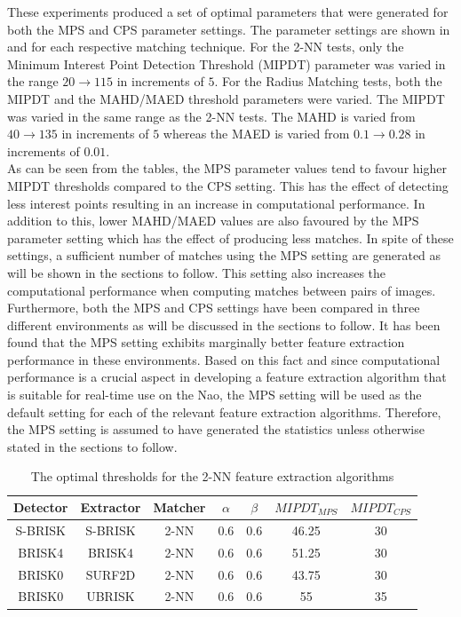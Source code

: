 These experiments produced a set of optimal parameters that were generated for both the MPS and CPS parameter settings. The parameter settings are shown in  and  for each respective matching technique. For the 2-NN tests, only the Minimum Interest Point Detection Threshold (MIPDT) parameter was varied in the range $20 \rightarrow 115$ in increments of $5$. For the Radius Matching tests, both the MIPDT and the MAHD/MAED threshold parameters were varied. The MIPDT was varied in the same range as the 2-NN tests. The MAHD is varied from $40 \rightarrow 135$ in increments of $5$ whereas the MAED is varied from $0.1 \rightarrow 0.28$ in increments of $0.01$.\\

As can be seen from the tables, the MPS parameter values tend to favour higher MIPDT thresholds compared to the CPS setting. This has the effect of detecting less interest points resulting in an increase in computational performance. In addition to this, lower MAHD/MAED values are also favoured by the MPS parameter setting which has the effect of producing less matches. In spite of these settings, a sufficient number of matches using the MPS setting are generated as will be shown in the sections to follow. This setting also increases the computational performance when computing matches between pairs of images.\\

Furthermore, both the MPS and CPS settings have been compared in three different environments as will be discussed in the sections to follow. It has been found that the MPS setting exhibits marginally better feature extraction performance in these environments. Based on this fact and since computational performance is a crucial aspect in developing a feature extraction algorithm that is suitable for real-time use on the Nao, the MPS setting will be used as the default setting for each of the relevant feature extraction algorithms. Therefore, the MPS setting is assumed to have generated the statistics unless otherwise stated in the sections to follow.\\

\begin{table}
\centering
\caption{The optimal thresholds for the 2-NN feature extraction algorithms}
\footnotesize
\begin{tabular}{|c|c|c|c|c|c|c|}
\hline 
Detector & Extractor & Matcher & $\alpha$ & $\beta$ & $MIPDT_{MPS}$ & $MIPDT_{CPS}$\tabularnewline
\hline 
\hline 
S-BRISK & S-BRISK & 2-NN & 0.6 & 0.6 & 46.25 & 30\tabularnewline
\hline 
BRISK4 & BRISK4 & 2-NN & 0.6 & 0.6 & 51.25 & 30\tabularnewline
\hline 
BRISK0 & SURF2D & 2-NN & 0.6 & 0.6 & 43.75 & 30\tabularnewline
\hline 
BRISK0 & UBRISK & 2-NN & 0.6 & 0.6 & 55 & 35\tabularnewline
\hline 
\end{tabular}
\label{tab:knnStatistics}
\end{table}

